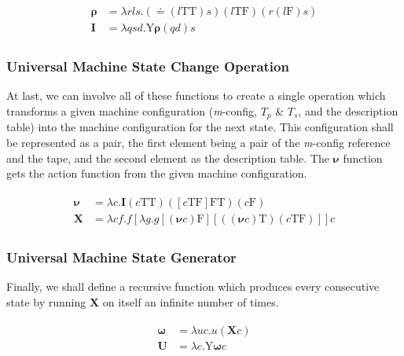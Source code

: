 \documentclass[Master.tex]{subfiles}
\begin{document}
\begin{gather*}
\begin{aligned}
\bm{\rho} &= \lambda rls.(\bm{\doteq}(l\bm{\mathrm{TT}})s)(l\bm{\mathrm{TF}})(r(l\bm{\mathrm{F}})s)\\
\bm{I} &= \lambda qsd.\bm{\mathrm{Y}\rho}(qd)s
\end{aligned}
\end{gather*}

\subsubsection{Universal Machine State Change Operation}

At last, we can involve all of these functions to create a single operation which transforms a given machine configuration (\textit{m}-config, $T_p$ \& $T_s$, and the description table) into the machine configuration for the next state. This configuration shall be represented as a pair, the first element being a pair of the \textit{m}-config reference and the tape, and the second element as the description table. The $\bm{\nu}$ function gets the action function from the given machine configuration.

\begin{gather*}
\begin{aligned}
\bm{\nu} &= \lambda c.\bm{I}(c\bm{\mathrm{TT}})([c\bm{\mathrm{TF}}]\bm{\mathrm{FT}})(c\bm{\mathrm{F}})\\
\bm{X} &= \lambda cf.f[\lambda g.g[(\bm{\nu}c)\bm{\mathrm{F}}][((\bm{\nu}c)\bm{\mathrm{T}})(c\bm{\mathrm{TF}})]]c
\end{aligned}
\end{gather*}

\subsubsection{Universal Machine State Generator}

Finally, we shall define a recursive function which produces every consecutive state by running $\bm{X}$ on itself an infinite number of times.

\begin{gather*}
\begin{aligned}
\bm{\omega} &= \lambda uc.u(\bm{X}c) \\
\bm{U} &= \lambda c.\bm{\mathrm{Y}}\bm{\omega}c
\end{aligned}
\end{gather*}
\end{document}
